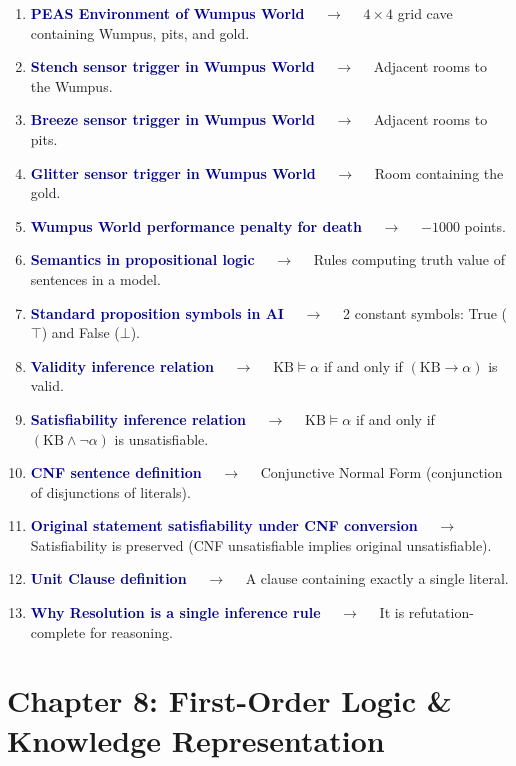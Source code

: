 \documentclass[11pt,a4paper]{article}
\begin{document}
\begin{enumerate}[label=\arabic*., leftmargin=*, labelsep=0.8em, itemsep=0.35em, parsep=0.1em, topsep=0.2em]
  \item \textcolor{darkblue}{\textbf{PEAS Environment of Wumpus World}} $\quad\to\quad$ $4\times4$ grid cave containing Wumpus, pits, and gold.
  \item \textcolor{darkblue}{\textbf{Stench sensor trigger in Wumpus World}} $\quad\to\quad$ Adjacent rooms to the Wumpus.
  \item \textcolor{darkblue}{\textbf{Breeze sensor trigger in Wumpus World}} $\quad\to\quad$ Adjacent rooms to pits.
  \item \textcolor{darkblue}{\textbf{Glitter sensor trigger in Wumpus World}} $\quad\to\quad$ Room containing the gold.
  \item \textcolor{darkblue}{\textbf{Wumpus World performance penalty for death}} $\quad\to\quad$ $-1000$ points.
  \item \textcolor{darkblue}{\textbf{Semantics in propositional logic}} $\quad\to\quad$ Rules computing truth value of sentences in a model.
  \item \textcolor{darkblue}{\textbf{Standard proposition symbols in AI}} $\quad\to\quad$ 2 constant symbols: True ($\top$) and False ($\bot$).
  \item \textcolor{darkblue}{\textbf{Validity inference relation}} $\quad\to\quad$ $\text{KB}\models\alpha$ if and only if $(\text{KB}\rightarrow\alpha)$ is valid.
  \item \textcolor{darkblue}{\textbf{Satisfiability inference relation}} $\quad\to\quad$ $\text{KB}\models\alpha$ if and only if $(\text{KB}\land\neg\alpha)$ is unsatisfiable.
  \item \textcolor{darkblue}{\textbf{CNF sentence definition}} $\quad\to\quad$ Conjunctive Normal Form (conjunction of disjunctions of literals).
  \item \textcolor{darkblue}{\textbf{Original statement satisfiability under CNF conversion}} $\quad\to\quad$ Satisfiability is preserved (CNF unsatisfiable implies original unsatisfiable).
  \item \textcolor{darkblue}{\textbf{Unit Clause definition}} $\quad\to\quad$ A clause containing exactly a single literal.
  \item \textcolor{darkblue}{\textbf{Why Resolution is a single inference rule}} $\quad\to\quad$ It is refutation-complete for reasoning.
\end{enumerate}

\section*{Chapter 8: First-Order Logic \& Knowledge Representation}
\end{document}
